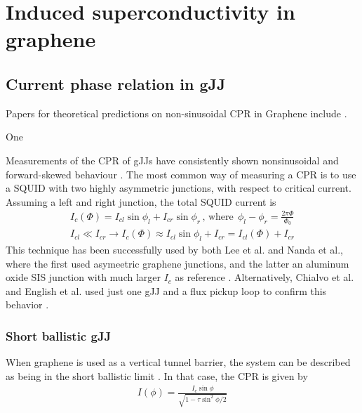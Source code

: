 \section{Induced superconductivity in graphene}
\subsection{Current phase relation in gJJ}
Papers for theoretical predictions on non-sinusoidal CPR in Graphene include \cite{titov_josephson_2006,black-schaffer_self-consistent_2008,girit_currentphase_2009,black-schaffer_strongly_2010,hagymasi_josephson_2010} .


One 

Measurements of the CPR of gJJs have consistently shown nonsinusoidal and forward-skewed behaviour \cite{chialvo_current-phase_2010,lee_ultimately_2015,english_observation_2016,nanda_current-phase_2017}. The most common way of measuring a CPR is to use a SQUID with two highly asymmetric junctions, with respect to critical current. Assuming a left and right junction, the total SQUID current is
\begin{eqnarray}
I_c(\Phi)=I_{cl}\sin\phi_l + I_{cr}\sin\phi_r \,\mathrm{,\,where\,}\; \phi_l - \phi_r = \frac{2\pi\Phi}{\Phi_0} \\%
I_{cl} \ll I_{cr} \rightarrow I_c(\Phi) \approx I_{cl}\sin\phi_l + I_{cr} = I_{cl}(\Phi) + I_{cr}
\end{eqnarray}
This technique has been successfully used by both Lee et al. and Nanda et al., where the first used asymeetric graphene junctions, and the latter an aluminum oxide SIS junction with much larger $I_c$ as reference \cite{lee_ultimately_2015,nanda_current-phase_2017}. Alternatively, Chialvo et al. and English et al. used just one gJJ and a flux pickup loop to confirm this behavior \cite{chialvo_current-phase_2010,english_observation_2016}.

\subsubsection{Short ballistic gJJ}
When graphene is used as a vertical tunnel barrier, the system can be described as being in the short ballistic limit \cite{lee_ultimately_2015}. In that case, the CPR is given by
\begin{eqnarray}
I(\phi)=\frac{I_c\sin\phi}{\sqrt{1-\tau\sin^2\phi/2}}
\end{eqnarray}

